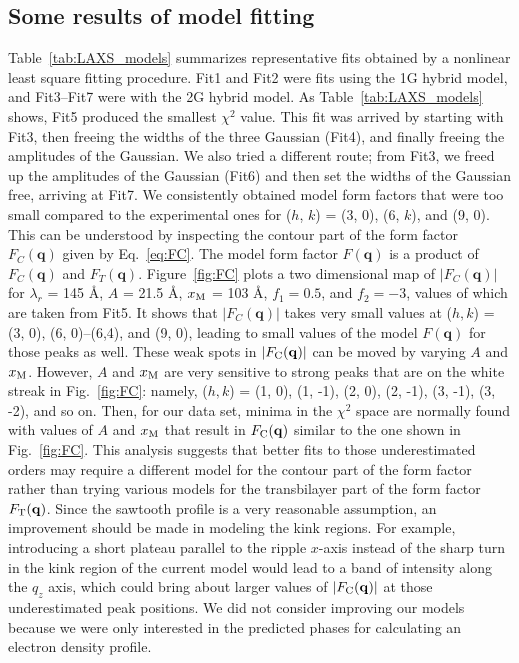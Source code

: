 \subsection{Some results of model fitting}\label{sec:LAXS_model_results}
Table~\ref{tab:LAXS_models} summarizes representative fits obtained by a nonlinear
least square fitting procedure. Fit1 and Fit2 were fits using the 1G hybrid model,
and Fit3--Fit7 were with the 2G hybrid model. As Table~\ref{tab:LAXS_models} shows, 
Fit5 produced the smallest $\chi^2$ value. This fit was arrived by 
starting with
Fit3, then freeing the widths of the three Gaussian (Fit4), 
and finally freeing the amplitudes of the Gaussian.
We also tried a different route; from Fit3, we freed up the amplitudes of 
the Gaussian (Fit6) and then set the widths of the Gaussian free, arriving  
at Fit7. 
We consistently obtained model
form factors that were too small compared to the experimental ones 
for ($h$, $k$) = (3, 0), (6, $k$), and (9, 0). This can be understood by
inspecting the contour part of the form factor $F_C(\mathbf{q})$ 
given by Eq.~\ref{eq:FC}.
The model form factor $F(\mathbf{q})$ is a product of
$F_C(\mathbf{q})$ and $F_T(\mathbf{q})$.
Figure~\ref{fig:FC} plots a two dimensional map of $|F_C(\mathbf{q})|$ for
$\lambda_r$ = 145 \AA, $A$ = 21.5 \AA, $x_\textrm{M}$ = 103 \AA, $f_1=0.5$,
and $f_2=-3$, values of which are taken from Fit5.
It shows that $|F_C(\mathbf{q})|$ takes very small values at 
($h, k$) = (3, 0), (6, 0)--(6,4), and (9, 0), leading to small values of
the model $F(\mathbf{q})$ for those peaks as well. These weak spots in $|F_\mathrm{C}(\mathbf{q})|$
can be moved by varying $A$ and $x_\textrm{M}$. However, $A$ and $x_\textrm{M}$ are very 
sensitive to strong peaks that are on the white streak in Fig.~\ref{fig:FC}:
namely, ($h, k$) = (1, 0), (1, -1), (2, 0), (2, -1), (3, -1), (3, -2), and so on.
Then, for our data set, minima in the $\chi^2$ space are normally found
with values of $A$ and $x_\textrm{M}$ that result in $F_\mathrm{C}(\mathbf{q})$ similar to the 
one shown in Fig.~\ref{fig:FC}.
This analysis 
suggests that better fits to those underestimated orders may require a different model
for the contour part of the form factor rather than trying various
models for the transbilayer part of the form factor $F_\mathrm{T}(\mathbf{q})$. 
Since the sawtooth profile is a very reasonable assumption, an improvement
should be made in modeling the kink regions.
For example, introducing a short plateau parallel to the ripple $x$-axis
instead of the sharp turn in the kink region of the current model would
lead to a band of intensity along the $q_z$ axis, which could bring about 
larger values of $|F_\mathrm{C}(\mathbf{q})|$ at those underestimated peak positions.
We did not consider improving our models because we were only interested in the predicted
phases for calculating an electron density profile.

